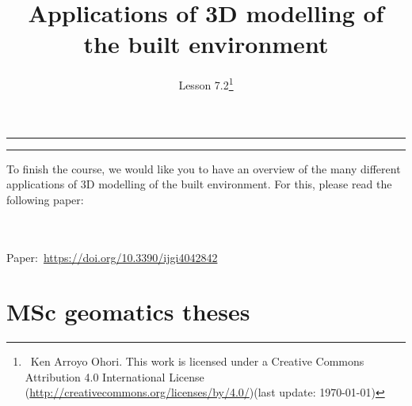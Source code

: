 

\newcommand{\lessonNumber}{Lesson 7.2}

\usepackage{listings}
\usepackage{color}
\lstset{style=mystyle,basicstyle=\ttfamily\footnotesize,breaklines=true}


\title{Applications of 3D modelling of the built environment}

\ohead*{\lessonNumber}
\titlehead{\thispagestyle{headings}}
\author{\lessonNumber\footnote{\ccbysa\ Ken Arroyo Ohori. This work is licensed under a Creative Commons Attribution 4.0 International License (\url{http://creativecommons.org/licenses/by/4.0/})\newline(last update: \today)}}
\date{}

\pagestyle{scrheadings}

\maketitle

\noindent\rule{5cm}{0.4pt}
\tableofcontents
\noindent\rule{5cm}{0.4pt}
\vspace{5mm}

To finish the course, we would like you to have an overview of the many different applications of 3D modelling of the built environment.
For this, please read the following paper:

\begin{link-box}
\\ \\
Paper:\ \url{https://doi.org/10.3390/ijgi4042842}
\end{link-box}

\section{MSc geomatics theses}

